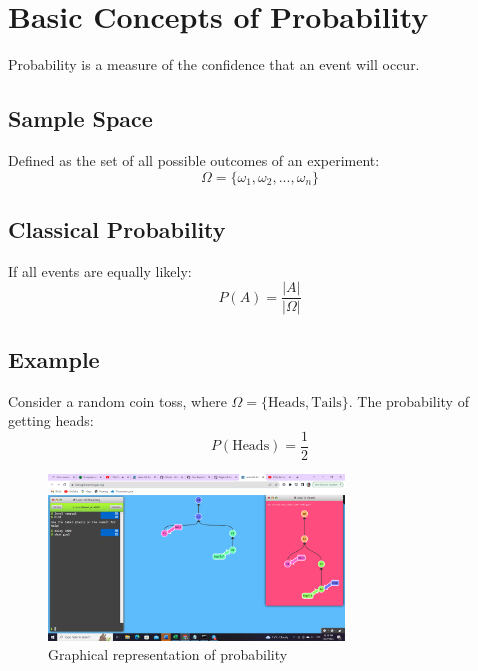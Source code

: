 \section{Basic Concepts of Probability}

Probability is a measure of the confidence that an event will occur.

\subsection{Sample Space}
Defined as the set of all possible outcomes of an experiment:
\[
\Omega = \{ \omega_1, \omega_2, ..., \omega_n \}
\]

\subsection{Classical Probability}
If all events are equally likely:
\[
P(A) = \frac{|A|}{|\Omega|}
\]

\subsection{Example}
Consider a random coin toss, where \( \Omega = \{ \text{Heads}, \text{Tails} \} \).
The probability of getting heads:
\[
P(\text{Heads}) = \frac{1}{2}
\]

\begin{figure}[h]
    \centering
    \includegraphics[width=0.7\textwidth]{images/example.png}
    \caption{Graphical representation of probability}
\end{figure}